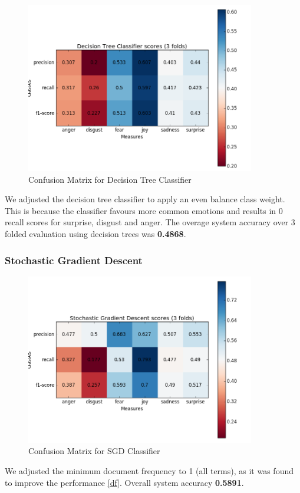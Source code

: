\begin{figure}[H]
\center
\includegraphics[width=10cm]{images/d_tree_matrix.png}
\caption{Confusion Matrix for Decision Tree Classifier}
\end{figure}

We adjusted the decision tree classifier to apply an even balance class weight. This is because the classifier favours more common emotions and results in 0 recall scores for surprise, disgust and anger. The overage system accuracy over 3 folded evaluation using decision trees was \textbf{0.4868}.

\subsubsection{Stochastic Gradient Descent}

\begin{figure}[H]
\center
\includegraphics[width=10cm]{images/SGD_matrix.png}
\caption{Confusion Matrix for SGD Classifier}
\end{figure}

We adjusted the minimum document frequency to 1 (all terms), as it was found to improve the performance \ref{df}. Overall system accuracy \textbf{0.5891}.

